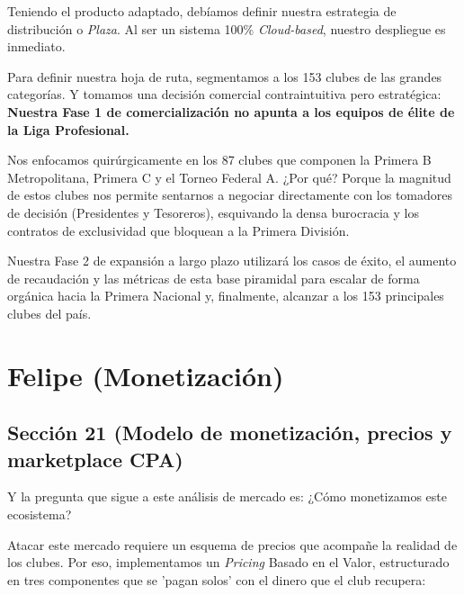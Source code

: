 Teniendo el producto adaptado, debíamos definir nuestra estrategia de distribución o \textit{Plaza}. Al ser un sistema 100\% \textit{Cloud-based}, nuestro despliegue es inmediato.

Para definir nuestra hoja de ruta, segmentamos a los 153 clubes de las grandes categorías. Y tomamos una decisión comercial contraintuitiva pero estratégica: \textbf{Nuestra Fase 1 de comercialización no apunta a los equipos de élite de la Liga Profesional.}

Nos enfocamos quirúrgicamente en los 87 clubes que componen la Primera B Metropolitana, Primera C y el Torneo Federal A. ¿Por qué? Porque la magnitud de estos clubes nos permite sentarnos a negociar directamente con los tomadores de decisión (Presidentes y Tesoreros), esquivando la densa burocracia y los contratos de exclusividad que bloquean a la Primera División.

Nuestra Fase 2 de expansión a largo plazo utilizará los casos de éxito, el aumento de recaudación y las métricas de esta base piramidal para escalar de forma orgánica hacia la Primera Nacional y, finalmente, alcanzar a los 153 principales clubes del país.

\newpage

\section{Felipe (Monetización)}

\subsection{Sección 21 (Modelo de monetización, precios y marketplace CPA)}

Y la pregunta que sigue a este análisis de mercado es: ¿Cómo monetizamos este ecosistema?

Atacar este mercado requiere un esquema de precios que acompañe la realidad de los clubes. Por eso, implementamos un \textit{Pricing} Basado en el Valor, estructurado en tres componentes que se 'pagan solos' con el dinero que el club recupera:

